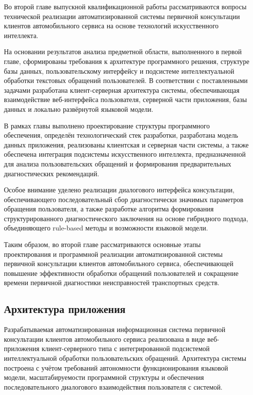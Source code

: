 \documentclass[14pt,a4paper]{extarticle}
\numberwithin{figure}{section}
\numberwithin{table}{section}
\begin{document}
Во второй главе выпускной квалификационной работы рассматриваются
вопросы технической реализации автоматизированной системы первичной
консультации клиентов автомобильного сервиса на основе технологий
искусственного интеллекта.

На основании результатов анализа предметной области, выполненного в
первой главе, сформированы требования к архитектуре программного
решения, структуре базы данных, пользовательскому интерфейсу и
подсистеме интеллектуальной обработки текстовых обращений пользователей.
В соответствии с поставленными задачами разработана клиент-серверная
архитектура системы, обеспечивающая взаимодействие веб-интерфейса
пользователя, серверной части приложения, базы данных и локально
развёрнутой языковой модели.

В рамках главы выполнено проектирование структуры программного
обеспечения, определён технологический стек разработки, разработана
модель данных приложения, реализованы клиентская и серверная части
системы, а также обеспечена интеграция подсистемы искусственного
интеллекта, предназначенной для анализа пользовательских обращений и
формирования предварительных диагностических рекомендаций.

Особое внимание уделено реализации диалогового интерфейса консультации,
обеспечивающего последовательный сбор диагностически значимых параметров
обращения пользователя, а также разработке алгоритма формирования
структурированного диагностического заключения на основе гибридного
подхода, объединяющего rule-based методы и возможности языковой модели.

Таким образом, во второй главе рассматриваются основные этапы
проектирования и программной реализации автоматизированной системы
первичной консультации клиентов автомобильного сервиса, обеспечивающей
повышение эффективности обработки обращений пользователей и сокращение
времени первичной диагностики неисправностей транспортных средств.

\subsection{Архитектура
приложения}\label{ux430ux440ux445ux438ux442ux435ux43aux442ux443ux440ux430-ux43fux440ux438ux43bux43eux436ux435ux43dux438ux44f}

Разрабатываемая автоматизированная информационная система первичной
консультации клиентов автомобильного сервиса реализована в виде
веб-приложения клиент-серверного типа с интегрированной подсистемой
интеллектуальной обработки пользовательских обращений. Архитектура
системы построена с учётом требований автономности функционирования
языковой модели, масштабируемости программной структуры и обеспечения
последовательного диалогового взаимодействия пользователя с системой.
\end{document}
